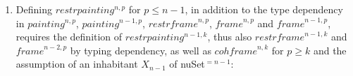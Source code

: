 \documentclass{article}
\newcommand{\myframe}{\mathit{frame}}
\newcommand{\painting}{\mathit{painting}}
\newcommand{\restrframe}{\mathit{restrframe}}
\newcommand{\restrpainting}{\mathit{restrpainting}}
\newcommand{\cohframe}{\mathit{cohframe}}
\begin{document}
\begin{enumerate}
  \item Defining $\restrpainting^{n,p}$ for $p\leq n-1$, in addition to
        the type dependency in $\painting^{n,p}$, $\painting^{n-1,p}$, $\restrframe^{n,p}$, $\myframe^{n,p}$ and
        $\myframe^{n-1,p}$, requires the definition of $\restrpainting^{n-1,k}$,
        thus also $\restrframe^{n-1,k}$ and $\myframe^{n-2,p}$ by typing
        dependency, as well as $\cohframe^{n,k}$ for $p \geq k$ and the
        assumption of an inhabitant $X_{n-1}$ of nuSet$^{=n-1}$:
        \begin{center}
        \end{center}


\end{enumerate}
\end{document}
